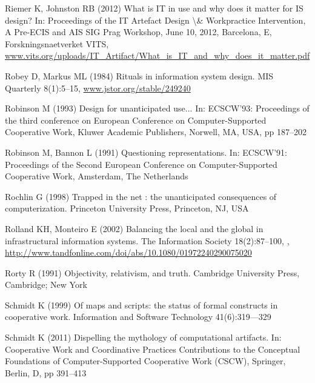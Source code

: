 \documentclass{article}
\begin{document}
\begin{thebibliography}{193}
Riemer K, Johnston RB (2012) What is {IT} in use and why does it matter for
  {IS} design? In: Proceedings of the {IT} Artefact Design {\textbackslash}\&
  Workpractice Intervention, A Pre-{ECIS} and {AIS} {SIG} Prag Workshop, June
  10, 2012, Barcelona, E, Forskningsnaetverket {VITS},
  \urlprefix\url{www.vits.org/uploads/IT_Artifact/What_is_IT_and_why_does_it_matter.pdf}

Robey D, Markus ML (1984) Rituals in information system design. {MIS} Quarterly
  8(1):5--15, \urlprefix\url{www.jstor.org/stable/249240}

Robinson M (1993) Design for unanticipated use... In: {ECSCW'93:} Proceedings
  of the third conference on European Conference on Computer-Supported
  Cooperative Work, Kluwer Academic Publishers, Norwell, {MA}, {USA}, pp
  187--202

Robinson M, Bannon L (1991) Questioning representations. In: {ECSCW'91:}
  Proceedings of the Second European Conference on Computer-Supported
  Cooperative Work, Amsterdam, The Netherlands

Rochlin G (1998) Trapped in the net : the unanticipated consequences of
  computerization. Princeton University Press, Princeton, {NJ}, {USA}

Rolland KH, Monteiro E (2002) Balancing the local and the global in
  infrastructural information systems. The Information Society 18(2):87--100,
  ,
  \urlprefix\url{http://www.tandfonline.com/doi/abs/10.1080/01972240290075020}

Rorty R (1991) Objectivity, relativism, and truth. Cambridge University Press,
  Cambridge; New York

Schmidt K (1999) Of maps and scripts: the status of formal constructs in
  cooperative work. Information and Software Technology 41(6):319---329

Schmidt K (2011) Dispelling the mythology of computational artifacts. In:
  Cooperative Work and Coordinative Practices Contributions to the Conceptual
  Foundations of Computer-Supported Cooperative Work {(CSCW)}, Springer,
  Berlin, D, pp 391--413


\end{thebibliography}
\end{document}
